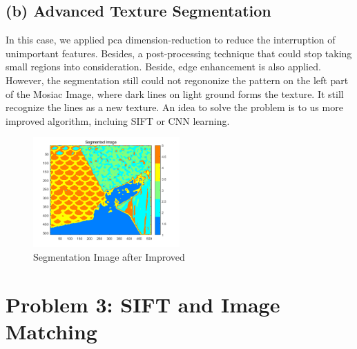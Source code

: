 \documentclass[12pt]{article}
\begin{document}
	\subsection*{(b) Advanced Texture Segmentation}
		In this case, we applied pca dimension-reduction to reduce the interruption of unimportant features. Besides, a post-processing technique that could stop taking small regions into consideration. Beside, edge enhancement is also applied. However, the segmentation still could not regononize the pattern on the left part of the Mosiac Image, where dark lines on light ground forms the texture. It still recognize the lines as a new texture. An idea to solve the problem is to us more improved algorithm, incluing SIFT or CNN learning. 
		\begin{figure}[H]
			\centering
			\includegraphics[width=0.5\textwidth]{segmented_image_b.png}
			\caption{Segmentation Image after Improved}
			\label{fig:segementaion2}
		\end{figure}
	\section{Problem 3: SIFT and Image Matching}
\end{document}
